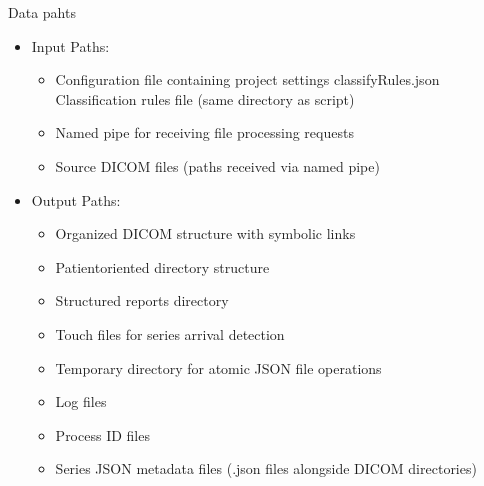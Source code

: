 \documentclass[letterpaper,10pt,english]{sphinxmanual}
\begin{document}
\sphinxAtStartPar
Data pahts
\begin{itemize}
\item {} 
\sphinxAtStartPar
Input Paths:
\begin{itemize}
\item {} 
\sphinxAtStartPar
{} \sphinxhyphen{} Configuration file containing project settings classifyRules.json \sphinxhyphen{} Classification rules file (same directory as script)

\item {} 
\sphinxAtStartPar
{} \sphinxhyphen{} Named pipe for receiving file processing requests

\item {} 
\sphinxAtStartPar
Source DICOM files (paths received via named pipe)

\end{itemize}

\item {} 
\sphinxAtStartPar
Output Paths:
\begin{itemize}
\item {} 
\sphinxAtStartPar
{} \sphinxhyphen{} Organized DICOM structure with symbolic links

\item {} 
\sphinxAtStartPar
{} \sphinxhyphen{} Patient\sphinxhyphen{}oriented  directory structure

\item {} 
\sphinxAtStartPar
{} \sphinxhyphen{} Structured reports directory

\item {} 
\sphinxAtStartPar
{} \sphinxhyphen{} Touch files for series arrival detection

\item {} 
\sphinxAtStartPar
{} \sphinxhyphen{} Temporary directory for atomic JSON file operations

\item {} 
\sphinxAtStartPar
{} \sphinxhyphen{} Log files

\item {} 
\sphinxAtStartPar
{} \sphinxhyphen{} Process ID files

\item {} 
\sphinxAtStartPar
Series JSON metadata files (.json files alongside DICOM directories)

\end{itemize}

\end{itemize}
\end{document}
